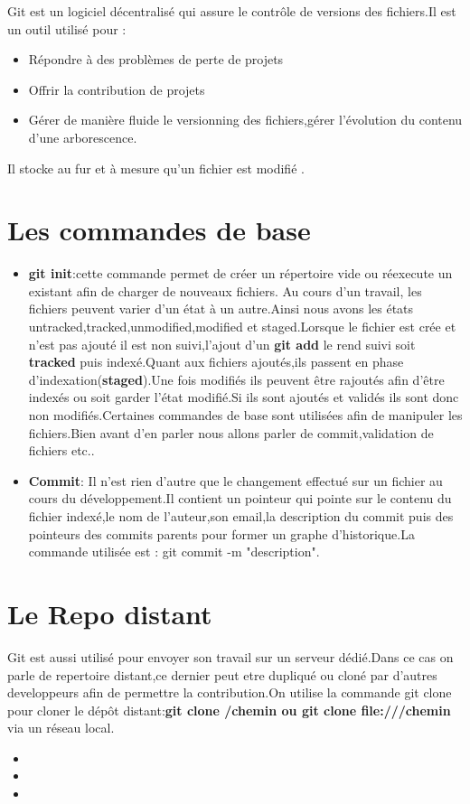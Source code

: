 \vspace{0.5cm}
Git  est un logiciel décentralisé qui assure le contrôle de versions des fichiers.Il est un outil utilisé pour :
\begin{itemize}
	\item Répondre à des problèmes de perte de projets
	\item Offrir la contribution de projets
	\item Gérer de manière fluide le versionning des fichiers,gérer l'évolution du contenu d'une arborescence.
\end{itemize}
Il stocke au fur et à mesure qu'un fichier est modifié .
\section*{Les commandes de base}
\begin{itemize}
	\item \textbf{git init}:cette commande permet de créer un répertoire vide ou réexecute un existant afin de charger de nouveaux fichiers.
	Au cours d'un travail, les fichiers peuvent varier d'un état à un autre.Ainsi nous avons les états untracked,tracked,unmodified,modified et staged.Lorsque le fichier est crée et n'est pas ajouté il est non suivi,l'ajout d'un \textbf{ git add} le rend suivi soit \textbf{tracked}  puis indexé.Quant aux fichiers ajoutés,ils passent en phase d'indexation(\textbf{staged}).Une fois modifiés ils peuvent être rajoutés afin d'être indexés ou soit garder l'état modifié.Si ils sont ajoutés et validés ils sont donc non modifiés.Certaines commandes de base sont utilisées afin de manipuler les fichiers.Bien avant d'en parler nous allons parler de commit,validation de fichiers etc..  
	\item \textbf{Commit}: Il n'est rien d'autre que le changement effectué sur un fichier au cours du développement.Il contient un pointeur qui pointe sur le contenu du fichier indexé,le nom de l'auteur,son email,la description du commit puis des pointeurs des commits  parents pour former un graphe d'historique.La commande utilisée est : git commit -m "description".  
\end{itemize}
\section*{Le Repo distant} 
Git est aussi utilisé pour envoyer son travail sur un serveur dédié.Dans ce cas on parle de repertoire distant,ce dernier peut etre dupliqué ou cloné par d'autres developpeurs afin de permettre la contribution.On utilise la commande git clone pour cloner le dépôt distant:\textbf{git clone /chemin ou git clone file:///chemin}
via un réseau local.
\begin{itemize}
	\item
	\item 
	\item  
\end{itemize}


